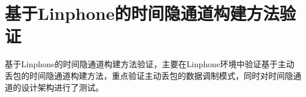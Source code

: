 \chapter{基于Linphone的时间隐通道构建方法验证}
\label{chap:linphone}

基于Linphone的时间隐通道构建方法验证，主要在Linphone环境中验证基于主动丢包的时间隐通道构建方法，重点验证主动丢包的数据调制模式，同时对时间隐通道的设计架构进行了测试。






